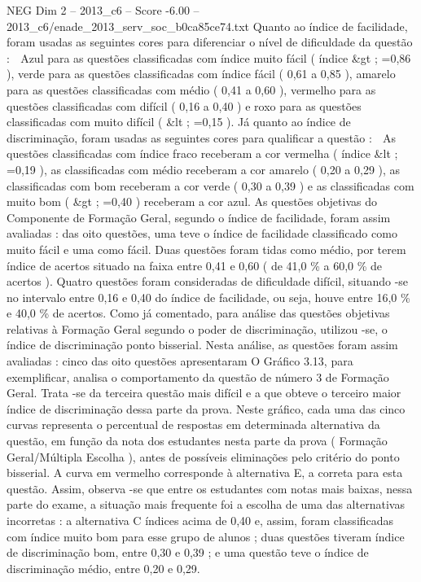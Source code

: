 \begin{textsample}{NEG Dim 2 – 2013\_c6 – Score -6.00 – 2013\_c6/enade\_2013\_serv\_soc\_b0ca85ce74.txt}
Quanto ao índice de facilidade, foram usadas as seguintes cores para diferenciar o nível de dificuldade da questão :  Azul para as questões classificadas com índice muito fácil ( índice \&gt ; =0,86 ), verde para as questões classificadas com índice fácil ( 0,61 a 0,85 ), amarelo para as questões classificadas com médio ( 0,41 a 0,60 ), vermelho para as questões classificadas com difícil ( 0,16 a 0,40 ) e roxo para as questões classificadas com muito difícil ( \&lt ; =0,15 ).
Já quanto ao índice de discriminação, foram usadas as seguintes cores para qualificar a questão :  As questões classificadas com índice fraco receberam a cor vermelha ( índice \&lt ; =0,19 ), as classificadas com médio receberam a cor amarelo ( 0,20 a 0,29 ), as classificadas com bom receberam a cor verde ( 0,30 a 0,39 ) e as classificadas com muito bom ( \&gt ; =0,40 ) receberam a cor azul.
As questões objetivas do Componente de Formação Geral, segundo o índice de facilidade, foram assim avaliadas : das oito questões, uma teve o índice de facilidade classificado como muito fácil e uma como fácil.
Duas questões foram tidas como médio, por terem índice de acertos situado na faixa entre 0,41 e 0,60 ( de 41,0 \% a 60,0 \% de acertos ).
Quatro questões foram consideradas de dificuldade difícil, situando -se no intervalo entre 0,16 e 0,40 do índice de facilidade, ou seja, houve entre 16,0 \% e 40,0 \% de acertos.
Como já comentado, para análise das questões objetivas relativas à Formação Geral segundo o poder de discriminação, utilizou -se, o índice de discriminação ponto bisserial.
Nesta análise, as questões foram assim avaliadas : cinco das oito questões apresentaram O Gráfico 3.13, para exemplificar, analisa o comportamento da questão de número 3 de Formação Geral.
Trata -se da terceira questão mais difícil e a que obteve o terceiro maior índice de discriminação dessa parte da prova.
Neste gráfico, cada uma das cinco curvas representa o percentual de respostas em determinada alternativa da questão, em função da nota dos estudantes nesta parte da prova ( Formação Geral/Múltipla Escolha ), antes de possíveis eliminações pelo critério do ponto bisserial.
A curva em vermelho corresponde à alternativa E, a correta para esta questão.
Assim, observa -se que entre os estudantes com notas mais baixas, nessa parte do exame, a situação mais frequente foi a escolha de uma das alternativas incorretas : a alternativa C índices acima de 0,40 e, assim, foram classificadas com índice muito bom para esse grupo de alunos ; duas questões tiveram índice de discriminação bom, entre 0,30 e 0,39 ; e uma questão teve o índice de discriminação médio, entre 0,20 e 0,29.

\end{textsample}
